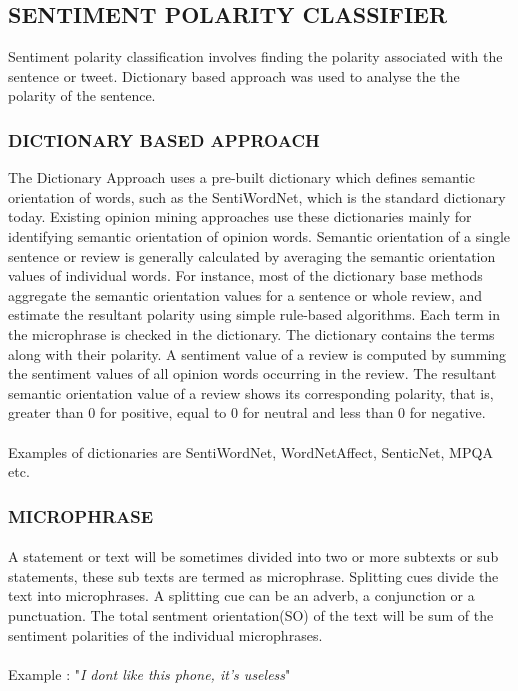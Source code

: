 \subsection{SENTIMENT POLARITY CLASSIFIER}
 Sentiment polarity classification involves finding the polarity associated with the sentence or tweet. Dictionary based approach was used to analyse the the polarity of the sentence.
\subsubsection{DICTIONARY BASED APPROACH}
The Dictionary Approach uses a pre-built dictionary which defines semantic orientation
of words, such as the SentiWordNet, which is the standard dictionary today. Existing opinion mining approaches use these dictionaries mainly for identifying semantic orientation of
opinion words. Semantic orientation of a single sentence or review is generally calculated
by averaging the semantic orientation values of individual words. For instance, most of
the dictionary base methods aggregate the semantic orientation values for a sentence or
whole review, and estimate the resultant polarity using simple rule-based algorithms.
Each term in the microphrase is checked in the dictionary. The dictionary contains the
terms along with their polarity. A sentiment value of a review is computed by summing
the sentiment values of all opinion words occurring in the review. The resultant semantic
orientation value of a review shows its corresponding polarity, that is, greater than 0 for
positive, equal to 0 for neutral and less than 0 for negative. \\ \\
Examples of dictionaries are SentiWordNet, WordNetAffect, SenticNet, MPQA etc.

\subsubsection{MICROPHRASE}
\paragraph{} A statement or text will be sometimes divided into two or more subtexts or sub statements, these sub texts are termed as microphrase. Splitting cues divide the text into microphrases. A splitting cue can be an adverb, a conjunction or a punctuation. The total sentment orientation(SO) of the text will be sum of the sentiment polarities of the individual microphrases.
\\ \\
Example : "\textit{I dont like this phone, it's useless}"

